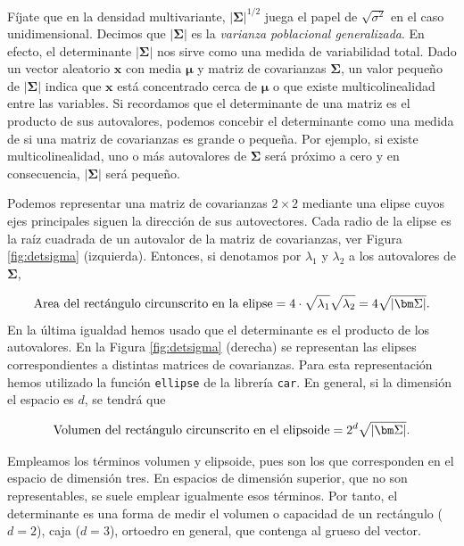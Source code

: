 \documentclass[
  a4paper,
  oneside]{scrbook}
\theoremstyle{definition}
\theoremstyle{definition}
\theoremstyle{definition}
\theoremstyle{definition}
\theoremstyle{remark}
\begin{document}
Fíjate que en la densidad multivariante, \(\left|\bm\Sigma\right|^{1/2}\)
juega el papel de \(\sqrt{\sigma^2}\) en el caso unidimensional. Decimos
que \(\left|\bm\Sigma\right|\) es la \emph{varianza poblacional generalizada}.
En efecto, el determinante \(\left|\bm\Sigma\right|\) nos sirve como una
medida de variabilidad total. Dado un vector aleatorio \(\bm{x}\) con
media \(\bm{\mu}\) y matriz de covarianzas \(\bm{\Sigma}\), un valor pequeño
de \(\left|\bm\Sigma\right|\) indica que \(\bm{x}\) está concentrado cerca
de \(\bm{\mu}\) o que existe multicolinealidad entre las variables. Si
recordamos que el determinante de una matriz es el producto de sus
autovalores, podemos concebir el determinante como una medida de si una
matriz de covarianzas es grande o pequeña. Por ejemplo, si existe
multicolinealidad, uno o más autovalores de \(\bm\Sigma\) será próximo a
cero y en consecuencia, \(\left|\bm\Sigma\right|\) será pequeño.

Podemos representar una matriz de covarianzas \(2\times 2\) mediante una
elipse cuyos ejes principales siguen la dirección de sus autovectores.
Cada radio de la elipse es la raíz cuadrada de un autovalor de la matriz
de covarianzas, ver Figura \ref{fig:detsigma} (izquierda). Entonces, si denotamos por
\(\lambda_1\) y \(\lambda_2\) a los autovalores de \(\bm\Sigma\),

\[\textnormal{Area del rectángulo circunscrito en la elipse}=4\cdot \sqrt{\lambda_1}\sqrt{\lambda_2}=4\sqrt{\left|\bm\Sigma\right|}.\]
En la última igualdad hemos usado que el determinante es el producto de
los autovalores. En la Figura \ref{fig:detsigma} (derecha) se representan las elipses
correspondientes a distintas matrices de covarianzas. Para esta
representación hemos utilizado la función \texttt{ellipse} de la librería
\texttt{car}. En general, si la dimensión el espacio es \(d\), se tendrá que

\[\textnormal{Volumen del rectángulo circunscrito en el elipsoide}=2^d\sqrt{\left|\bm\Sigma\right|}.\]

Empleamos los términos volumen y elipsoide, pues son los que
corresponden en el espacio de dimensión tres. En espacios de dimensión
superior, que no son representables, se suele emplear igualmente esos
términos. Por tanto, el determinante es una forma de medir el volumen o
capacidad de un rectángulo (\(d=2\)), caja (\(d=3\)), ortoedro en general,
que contenga al grueso del vector.
\end{document}
